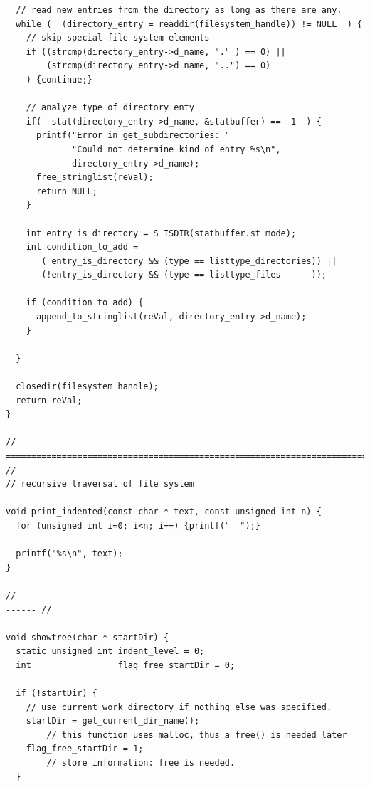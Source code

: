 \begin{codebox}[]
\begin{verbatim}
  // read new entries from the directory as long as there are any.
  while (  (directory_entry = readdir(filesystem_handle)) != NULL  ) {
    // skip special file system elements
    if ((strcmp(directory_entry->d_name, "." ) == 0) ||
        (strcmp(directory_entry->d_name, "..") == 0)
    ) {continue;}
    
    // analyze type of directory enty
    if(  stat(directory_entry->d_name, &statbuffer) == -1  ) {
      printf("Error in get_subdirectories: "
             "Could not determine kind of entry %s\n", 
             directory_entry->d_name);
      free_stringlist(reVal);
      return NULL;
    }
    
    int entry_is_directory = S_ISDIR(statbuffer.st_mode);
    int condition_to_add =
       ( entry_is_directory && (type == listtype_directories)) ||
       (!entry_is_directory && (type == listtype_files      ));
    
    if (condition_to_add) {
      append_to_stringlist(reVal, directory_entry->d_name);
    }
    
  }
  
  closedir(filesystem_handle);
  return reVal;
}

// ========================================================================= //
// recursive traversal of file system

void print_indented(const char * text, const unsigned int n) {
  for (unsigned int i=0; i<n; i++) {printf("  ");}
  
  printf("%s\n", text);
}

// ------------------------------------------------------------------------- //

void showtree(char * startDir) {
  static unsigned int indent_level = 0;
  int                 flag_free_startDir = 0;
  
  if (!startDir) {
    // use current work directory if nothing else was specified.
    startDir = get_current_dir_name();
        // this function uses malloc, thus a free() is needed later
    flag_free_startDir = 1;
        // store information: free is needed.
  }
\end{verbatim}
\end{codebox}

